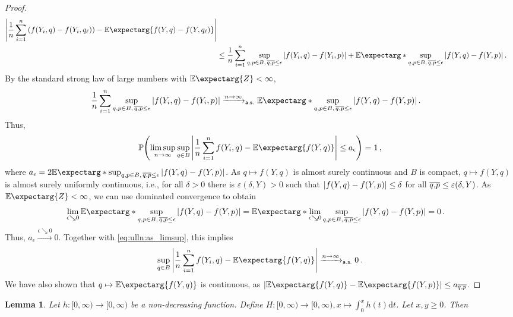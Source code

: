 \documentclass{scrartcl}
\newcommand{\PrOf}[1]{\Pr\mathopen{}\lb #1 \rb\mathclose{}}
\newcommand{\Ex}{\E\expectarg}
\newcommand*{\ms}[1]{\mathsf{#1}}
\newcommand{\dl}{\mathrm{d}}
\newcommand{\equationFullstop}{\, .}
\newcommand{\eqfs}{\equationFullstop}
\newcommand{\equationComma}{\, ,}
\newcommand{\eqcm}{\equationComma}
\newcommand{\sol}[2]{\overline{#1,#2}}
\theoremstyle{plain}\newtheorem{theorem}{Theorem}[section]
\newtheorem{lemma}[theorem]{Lemma}
\theoremstyle{definition}
\theoremstyle{remark}
\begin{document}
\begin{appendix}
\begin{proof}
\begin{align*}
		\abs{\frac 1n \sum_{i=1}^n \br{f(Y_i, q) - f(Y_i, q_\ell)} - \Ex{f(Y, q) - f(Y, q_\ell)}}
	\\& \leq
	\frac 1n \sum_{i=1}^n \sup_{q,p\in B,\, \sol qp \leq \epsilon} \abs{f(Y_i, q) - f(Y_i, p)} 
	+ 
	\Ex*{\sup_{q,p\in B,\, \sol qp \leq \epsilon} \abs{f(Y, q) - f(Y, p)}} 
	\eqfs
\end{align*}
By the standard strong law of large numbers with $\Ex{Z} < \infty$, 
\begin{align*}
	\frac 1n \sum_{i=1}^n \sup_{q,p\in B,\, \sol qp \leq \epsilon} \abs{f(Y_i, q) - f(Y_i, p)} 
	&\xrightarrow{n \to \infty}_{\ms{a.s.}} 
	\Ex*{\sup_{q,p\in B,\, \sol qp \leq \epsilon} \abs{f(Y, q) - f(Y, p)} }
	\eqfs
\end{align*}
Thus,
\begin{equation}\label{eq:ulln:as_limsup}
	\PrOf{
		\limsup_{n\to\infty} \sup_{q\in B} \abs{\frac 1n \sum_{i=1}^n f(Y_i, q) - \Ex{f(Y, q)}}
		\leq
		a_\epsilon
	} = 1
	\eqcm
\end{equation}
where $a_\epsilon = 2 \Ex*{\sup_{q,p\in B,\, \sol qp \leq \epsilon} \abs{f(Y, q) - f(Y, p)} }$.
As $q \mapsto f(Y, q)$ is almost surely continuous and $B$ is compact, $q \mapsto f(Y, q)$ is almost surely uniformly continuous, i.e., for all $\delta > 0$ there is $\varepsilon(\delta, Y) > 0$ such that $\left| f(Y,q)-f(Y,p) \right| \leq \delta$ for all $\overline{q,\!p} \leq \varepsilon(\delta, Y)$.
As $\Ex{Z} < \infty$, we can use dominated convergence to obtain 
\begin{align*}
	\lim_{\epsilon\searrow0} 	\Ex*{\sup_{q,p\in B,\, \sol qp \leq \epsilon} \abs{f(Y, q) - f(Y, p)} }
	&=
	\Ex*{\lim_{\epsilon\searrow0}\sup_{q,p\in B,\, \sol qp \leq \epsilon} \abs{f(Y, q) - f(Y, p)} }
	=
	0
	\eqfs
\end{align*}
Thus, $a_\epsilon \xrightarrow{\epsilon\searrow0} 0$. Together with \eqref{eq:ulln:as_limsup}, this implies
\begin{equation*}
 \sup_{q\in B} \abs{\frac 1n \sum_{i=1}^n f(Y_i, q) - \Ex{f(Y, q)}} \xrightarrow{n \to \infty}_{\ms{a.s.}} 0
 \eqfs
\end{equation*}
We have also shown that $q\mapsto \Ex{f(Y, q)}$ is continuous, as $\abs{\Ex{f(Y, q)}-\Ex{f(Y, p)}} \leq a_{\sol qp}$.
\end{proof}
 \begin{lemma}\label{lmm:nondec}
Let $h \colon [0,\infty) \to [0,\infty)$ be a non-decreasing function.
Define $H \colon [0,\infty) \to [0,\infty), x\mapsto \int_0^x h(t) \dl t$.
Let $x, y \geq 0$. Then
\begin{enumerate}[label=(\roman*)]

\end{enumerate}
\end{lemma}
\end{appendix}
\end{document}
